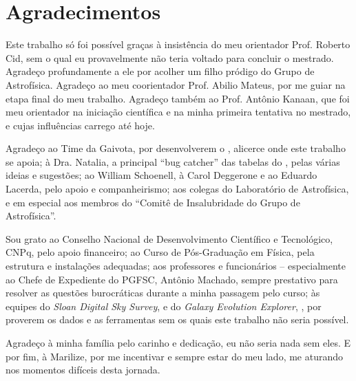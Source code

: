


\chapter*{Agradecimentos}

Este trabalho só foi possível graças à insistência do meu orientador Prof.
Roberto Cid, sem o qual eu provavelmente não teria voltado para concluir o
mestrado. Agradeço profundamente a ele por acolher um filho pródigo do Grupo de
Astrofísica. Agradeço ao meu coorientador Prof. Abilio Mateus, por me guiar na
etapa final do meu trabalho. Agradeço também ao Prof. Antônio Kanaan, que foi
meu orientador na iniciação científica e na minha primeira tentativa no
mestrado, e cujas influências carrego até hoje.

Agradeço ao Time da Gaivota, por desenvolverem o \starlight, alicerce onde este
trabalho se apoia; à Dra. Natalia, a principal ``bug catcher'' das tabelas do
\starlight, pelas várias ideias e sugestões; ao William Schoenell, à Carol
Deggerone e ao Eduardo Lacerda, pelo apoio e companheirismo; aos colegas do
Laboratório de Astrofísica, e em especial aos membros do ``Comitê de
Insalubridade do Grupo de Astrofísica''.

Sou grato ao Conselho Nacional de Desenvolvimento Científico e Tecnológico,
CNPq, pelo apoio financeiro; ao Curso de Pós-Graduação em Física, pela estrutura
e instalações adequadas; aos professores e funcionários -- especialmente ao
Chefe de Expediente do PGFSC, Antônio Machado, sempre prestativo para resolver
as questões burocráticas durante a minha passagem pelo curso; às equipes do {\em
Sloan Digital Sky Survey}, \SDSS e do {\em Galaxy Evolution Explorer}, \galex,
por proverem os dados e as ferramentas sem os quais este trabalho não seria
possível.

Agradeço à minha família pelo carinho e dedicação, eu não seria nada sem eles. E
por fim, à Marilize, por me incentivar e sempre estar do meu lado, me aturando
nos momentos difíceis desta jornada.


